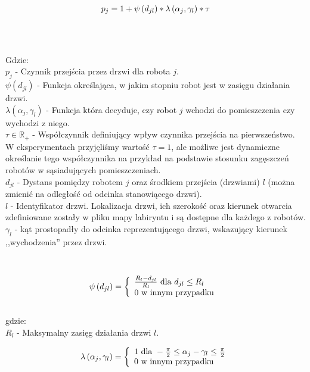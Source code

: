 \begin{equation}
p_j = 1 + \psi\left(d_{jl}\right) * \lambda\left(\alpha_j,\gamma_l\right) * \tau \\
\label{eq:factorpassageby}
\end{equation}
\\
\\
\\
Gdzie:
\\
$ p_j $ - Czynnik przejścia przez drzwi dla robota $ j $.
\\
$ \psi\left(d_{jl}\right) $ - Funkcja określająca, w jakim stopniu robot jest w zasięgu działania drzwi.
\\
$ \lambda(\alpha_j,\gamma_l) $ - Funkcja która decyduje, czy robot $j$ wchodzi do pomieszczenia czy wychodzi z niego.
\\
$ \tau \in \mathbb{R}_{+} $ - Współczynnik definiujący wpływ czynnika przejścia na pierwszeństwo. W eksperymentach przyjęliśmy wartość $ \tau = 1 $, ale możliwe jest dynamiczne określanie tego współczynnika na przykład na podstawie stosunku zagęszczeń robotów w sąsiadujących pomieszczeniach.
\\
$ d_{jl} $ - Dystans pomiędzy robotem $ j $ oraz środkiem przejścia (drzwiami) $ l $ (można zmienić na odległość od odcinka stanowiącego drzwi).
\\
$ l $ - Identyfikator drzwi. Lokalizacja drzwi, ich szerokość oraz kierunek otwarcia zdefiniowane zostały w pliku mapy labiryntu i są dostępne dla każdego z robotów.
\\
$ \gamma_l $ - kąt prostopadły do odcinka reprezentującego drzwi, wskazujący kierunek ,,wychodzenia'' przez drzwi. 
\\
\\
\\
\begin{equation}
	\psi\left(d_{jl}\right) = \left\{\begin{array}{ll}
	\frac{R_{l} - d_{jl}}{R_{l}} \mbox{ dla } d_{jl} \le R_{l} \\
		0 \mbox{ w innym przypadku }        
	\cr
	\end{array}\right.
\end{equation}
\\
\noindent
gdzie:\\
$ R_{l} $ - Maksymalny zasięg działania drzwi $l$. 

\begin{equation}
\lambda\left(\alpha_j,\gamma_l\right) = \left\{\begin{array}{ll}
1  \mbox{ dla } - \frac{\pi}{2} \leq \alpha_j - \gamma_l \leq \frac{\pi}{2} \\
0  \mbox{ w innym przypadku }
\cr
\end{array}\right.
\end{equation}
